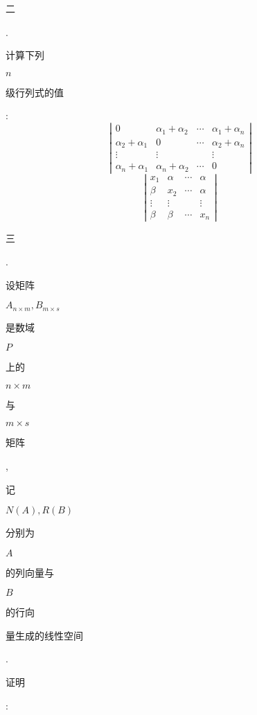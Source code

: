 \documentclass[10pt]{article}
\begin{document}
\begin{CJK}{UTF8}{mj}二\end{CJK}. \begin{CJK}{UTF8}{mj}计算下列\end{CJK} $n$ \begin{CJK}{UTF8}{mj}级行列式的值\end{CJK}:
$$
\left|\begin{array}{cccc}
0 & \alpha_{1}+\alpha_{2} & \cdots & \alpha_{1}+\alpha_{n} \\
\alpha_{2}+\alpha_{1} & 0 & \cdots & \alpha_{2}+\alpha_{n} \\
\vdots & \vdots & & \vdots \\
\alpha_{n}+\alpha_{1} & \alpha_{n}+\alpha_{2} & \cdots & 0
\end{array}\right|
$$
$$
\left|\begin{array}{cccc}
x_{1} & \alpha & \cdots & \alpha \\
\beta & x_{2} & \cdots & \alpha \\
\vdots & \vdots & & \vdots \\
\beta & \beta & \cdots & x_{n}
\end{array}\right|
$$
\begin{CJK}{UTF8}{mj}三\end{CJK}. \begin{CJK}{UTF8}{mj}设矩阵\end{CJK} $A_{n \times m}, B_{m \times s}$ \begin{CJK}{UTF8}{mj}是数域\end{CJK} $P$ \begin{CJK}{UTF8}{mj}上的\end{CJK} $n \times m$ \begin{CJK}{UTF8}{mj}与\end{CJK} $m \times s$ \begin{CJK}{UTF8}{mj}矩阵\end{CJK}, \begin{CJK}{UTF8}{mj}记\end{CJK} $N(A), R(B)$ \begin{CJK}{UTF8}{mj}分别为\end{CJK} $A$ \begin{CJK}{UTF8}{mj}的列向量与\end{CJK} $B$ \begin{CJK}{UTF8}{mj}的行向\end{CJK} \begin{CJK}{UTF8}{mj}量生成的线性空间\end{CJK}. \begin{CJK}{UTF8}{mj}证明\end{CJK}:
\end{document}
